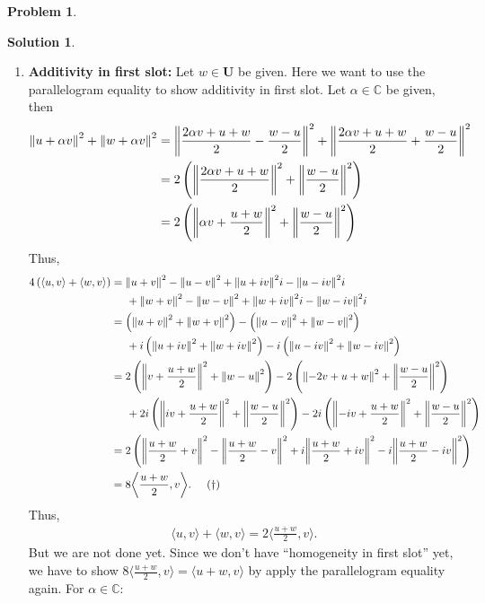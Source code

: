 \documentclass{article}
\theoremstyle{definition}
\newtheorem*{prob*}{Problem}
\newtheorem*{sln*}{Solution}
\newcommand{\U}{\mathbf{U}}
\newcommand{\la}{\langle}
\newcommand{\ra}{\rangle}
\begin{document}
\begin{prob*}
\begin{enumerate}
\begin{sln*}
\begin{enumerate}
				\item \textbf{Additivity in first slot:} Let $w\in \U$ be given. Here we want to use the parallelogram equality to show additivity in first slot. Let $\alpha \in \mathbb{C}$ be given, then
				\begin{align*}
				\norm{u + \alpha v}^2 + \norm{w + \alpha v}^2 &= \norm{\frac{2\alpha v+u+w}{2} - \frac{w-u}{2}}^2 + \norm{\frac{2\alpha v+u+w}{2} + \frac{w-u}{2}}^2 \\
				&= 2 \left( \norm{\frac{2\alpha v+ u + w}{2}}^2 + \norm{\frac{w-u}{2}}^2  \right)\\
				&= 2 \left( \norm{\alpha v  + \frac{u + w}{2}}^2 + \norm{\frac{w-u}{2}}^2  \right)\\
				\end{align*}
				Thus, 
				\begin{align*}
				4\left(\la u,v \ra + \la w,v \ra\right) 
				&= \norm{u+ v}^2  - \norm{u-v}^2 + \norm{u + iv}^2i - \norm{u - iv}^2i \\
				&\hspace{0.5cm}+ \norm{w+ v}^2  - \norm{w-v}^2 + \norm{w + iv}^2i - \norm{w - iv}^2i\\
				&=  \left(\norm{u+ v}^2 + \norm{w+ v}^2\right) - \left(\norm{u-v}^2 + \norm{w-v}^2 \right) \\ 
				&\hspace{0.5cm}+ i \left( \norm{u + iv}^2  + \norm{w + iv}^2 \right) - i\left(\norm{u - iv}^2 + \norm{w - iv}^2 \right) \\
				&= 2\left( \norm{ v + \frac{ u + w}{2}}^2 + \norm{w - u}^2 \right) 
				- 2\left( \norm{ - 2v + u + w}^2 + \norm{\frac{w - u}{2}}^2 \right) \\
				&\hspace{0.5cm} + 2i\left( \norm{ iv + \frac{u + w}{2}}^2 + \norm{\frac{w - u}{2}}^2 \right)
				- 2i\left( \norm{ -iv + \frac{u + w}{2}}^2 + \norm{\frac{w - u}{2}}^2 \right)\\
				&= 2\left( \norm{ \frac{u + w}{2}+ v}^2 - \norm{\frac{u + w}{2} -v}^2 + i\norm{\frac{u+w}{2}+iv}^2 - i\norm{\frac{u+w}{2}-iv}^2 \right)\\
				&= 8 \bigg\langle \frac{u+w}{2}, v \bigg\rangle. \hspace{0.5cm} (\dagger)
				\end{align*}
				Thus, 
				\begin{align*}
				\la u,v \ra + \la w, v \ra = 2\bigg\la \frac{u+w}{2} ,v \bigg\ra.
				\end{align*}
				But we are not done yet. Since we don't have ``homogeneity in first slot'' yet, we have to show $8 \bigg\langle \frac{u+w}{2}, v \bigg\rangle = \la u+ w, v \ra$ by apply the parallelogram equality again. For $\alpha \in \mathbb{C}$:

\end{enumerate}
\end{sln*}
\end{enumerate}
\end{prob*}
\end{document}

